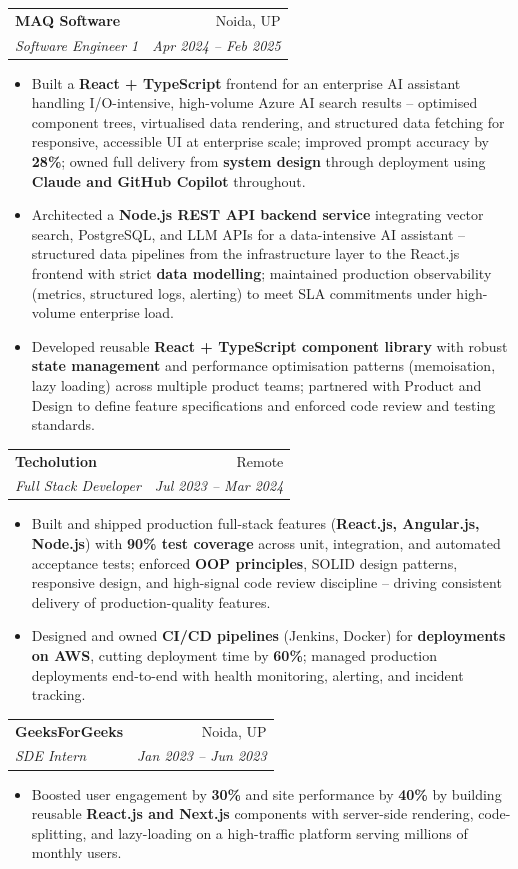 \documentclass[a4paper,20pt]{article}
\makeatletter
\newcommand{\resumeSubheading}[4]{\vspace{-1pt}\item\begin{tabular*}{0.97\textwidth}{l@{\extracolsep{\fill}}r}\textbf{#1} & #2 \\\textit{#3} & \textit{#4} \\\end{tabular*}\vspace{-5pt}}
\newcommand{\resumeItemListStart}{\begin{itemize}}
\newcommand{\resumeItemListEnd}{\end{itemize}\vspace{-5pt}}
\makeatother
\begin{document}
    \resumeSubheading
      {MAQ Software}{Noida, UP}
      {Software Engineer 1}{Apr 2024 -- Feb 2025}
      \resumeItemListStart
        \item\small{Built a \textbf{React + TypeScript} frontend for an enterprise AI assistant handling I/O-intensive, high-volume Azure AI search results -- optimised component trees, virtualised data rendering, and structured data fetching for responsive, accessible UI at enterprise scale; improved prompt accuracy by \textbf{28\%}; owned full delivery from \textbf{system design} through deployment using \textbf{Claude and GitHub Copilot} throughout.}
        \item\small{Architected a \textbf{Node.js REST API backend service} integrating vector search, PostgreSQL, and LLM APIs for a data-intensive AI assistant -- structured data pipelines from the infrastructure layer to the React.js frontend with strict \textbf{data modelling}; maintained production observability (metrics, structured logs, alerting) to meet SLA commitments under high-volume enterprise load.}
        \item\small{Developed reusable \textbf{React + TypeScript component library} with robust \textbf{state management} and performance optimisation patterns (memoisation, lazy loading) across multiple product teams; partnered with Product and Design to define feature specifications and enforced code review and testing standards.}
      \resumeItemListEnd

    \resumeSubheading
      {Techolution}{Remote}
      {Full Stack Developer}{Jul 2023 -- Mar 2024}
      \resumeItemListStart
        \item\small{Built and shipped production full-stack features (\textbf{React.js, Angular.js, Node.js}) with \textbf{90\% test coverage} across unit, integration, and automated acceptance tests; enforced \textbf{OOP principles}, SOLID design patterns, responsive design, and high-signal code review discipline -- driving consistent delivery of production-quality features.}
        \item\small{Designed and owned \textbf{CI/CD pipelines} (Jenkins, Docker) for \textbf{deployments on AWS}, cutting deployment time by \textbf{60\%}; managed production deployments end-to-end with health monitoring, alerting, and incident tracking.}
      \resumeItemListEnd

    \resumeSubheading
      {GeeksForGeeks}{Noida, UP}
      {SDE Intern}{Jan 2023 -- Jun 2023}
      \resumeItemListStart
        \item\small{Boosted user engagement by \textbf{30\%} and site performance by \textbf{40\%} by building reusable \textbf{React.js and Next.js} components with server-side rendering, code-splitting, and lazy-loading on a high-traffic platform serving millions of monthly users.}
      \resumeItemListEnd
\end{document}
